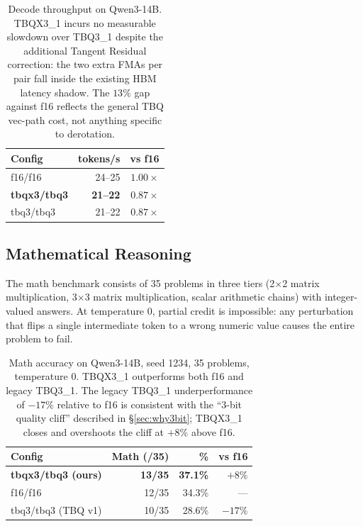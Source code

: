 \documentclass[10pt,twocolumn]{article}
\begin{document}
\begin{table}[h]
\centering
\small
\begin{tabular}{@{}lrr@{}}
\toprule
\textbf{Config} & \textbf{tokens/s} & \textbf{vs f16} \\
\midrule
f16/f16               & 24--25 & $1.00\times$ \\
\textbf{tbqx3/tbq3}   & \textbf{21--22} & \textbf{$0.87\times$} \\
tbq3/tbq3             & 21--22 & $0.87\times$ \\
\bottomrule
\end{tabular}
\caption{Decode throughput on Qwen3-14B. TBQX3\_1 incurs no measurable slowdown over TBQ3\_1 despite the additional Tangent Residual correction: the two extra FMAs per pair fall inside the existing HBM latency shadow. The $13\%$ gap against f16 reflects the general TBQ vec-path cost, not anything specific to derotation.}
\label{tab:throughput}
\end{table}

\subsection{Mathematical Reasoning}

The math benchmark consists of 35 problems in three tiers (2$\times$2 matrix multiplication, 3$\times$3 matrix multiplication, scalar arithmetic chains) with integer-valued answers. At temperature $0$, partial credit is impossible: any perturbation that flips a single intermediate token to a wrong numeric value causes the entire problem to fail.

\begin{table}[t]
\centering
\small
\begin{tabular}{@{}lrrr@{}}
\toprule
\textbf{Config} & \textbf{Math (/35)} & \textbf{\%} & \textbf{vs f16} \\
\midrule
\textbf{tbqx3/tbq3 (ours)} & \textbf{13/35} & \textbf{37.1\%} & \textbf{$+8\%$} \\
f16/f16                    & 12/35 & 34.3\% & --- \\
tbq3/tbq3 (TBQ v1)         & 10/35 & 28.6\% & $-17\%$ \\
\bottomrule
\end{tabular}
\caption{Math accuracy on Qwen3-14B, seed 1234, 35 problems, temperature $0$. TBQX3\_1 outperforms both f16 and legacy TBQ3\_1. The legacy TBQ3\_1 underperformance of $-17\%$ relative to f16 is consistent with the ``3-bit quality cliff'' described in \S\ref{sec:why3bit}; TBQX3\_1 closes and overshoots the cliff at $+8\%$ above f16.}
\label{tab:math}
\end{table}
\end{document}
